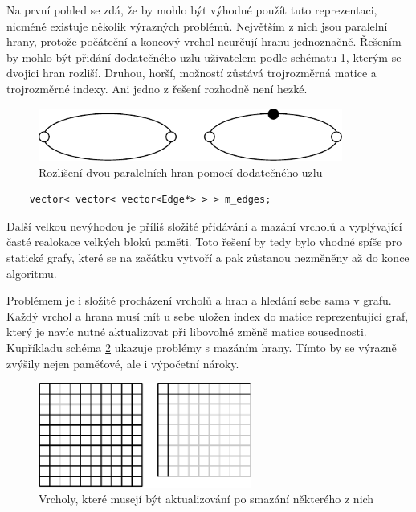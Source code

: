 \documentclass[11pt,twoside,a4paper]{book}
\begin{document}
Na první pohled se zdá, že by mohlo být výhodné použít tuto reprezentaci, nicméně existuje několik výrazných problémů. Největším z nich jsou paralelní hrany, protože počáteční a koncový vrchol neurčují hranu jednoznačně. Řešením by mohlo být přidání dodatečného uzlu uživatelem podle schématu \ref{fig:parallel_edges}, kterým se dvojici hran rozliší. Druhou, horší, možností zůstává trojrozměrná matice a trojrozměrné indexy. Ani jedno z řešení rozhodně není hezké.

\begin{figure}[ht]
\begin{center}
\includegraphics[width=10cm]{img/parallel_edges.pdf}
\caption{Rozlišení dvou paralelních hran pomocí dodatečného uzlu}
\label{fig:parallel_edges}
\end{center}
\end{figure}

\begin{verbatim}
    vector< vector< vector<Edge*> > > m_edges;
\end{verbatim}

Další velkou nevýhodou je příliš složité přidávání a mazání vrcholů a vyplývající časté realokace velkých bloků paměti. Toto řešení by tedy bylo vhodné spíše pro statické grafy, které se na začátku vytvoří a pak zůstanou nezměněny až do konce algoritmu.

Problémem je i složité procházení vrcholů a hran a hledání sebe sama v grafu. Každý vrchol a hrana musí mít u sebe uložen index do matice reprezentující graf, který je navíc nutné aktualizovat při libovolné změně matice sousednosti. Kupříkladu schéma \ref{fig:update_indices} ukazuje problémy s mazáním hrany. Tímto by se výrazně zvýšily nejen paměťové, ale i výpočetní nároky.

\begin{figure}[ht]
\begin{center}
\includegraphics[width=7cm]{img/update_indices.pdf}
\caption{Vrcholy, které musejí být aktualizování po smazání některého z nich}
\label{fig:update_indices}
\end{center}
\end{figure}
\end{document}
